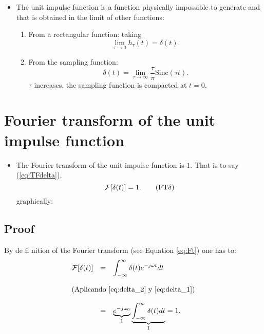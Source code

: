 \begin{itemize}
\item The unit impulse function is a function physically impossible to
  generate and that is obtained in the limit of other functions:
  \begin{enumerate}
  \item From a rectangular function:
    taking
    $$
    \lim_{\tau\rightarrow0}h_\tau(t) = \delta(t).
    $$
  \item From the sampling function:
    \begin{equation}
      \delta(t) =
      \lim_{\tau\rightarrow\infty}\frac{\tau}{\pi}\mathrm{Sinc}(\tau
      t).  \tag{delta\_muestreo}
      \label{eq:delta_muestreo}
    \end{equation}
    $\tau$ increases, the sampling function is compacted at $t=0$.
  \end{enumerate}
\end{itemize}

\section{Fourier transform of the unit impulse function}
\begin{itemize}
\item [] The Fourier transform of the unit impulse function is
  $1$. That is to say (\ref{eq:TFdelta}),
  \begin{equation}
    {\cal{F}}[\delta(t)]=1.
    \tag{FT$\delta$}
    \label{eq:TFdelta}
  \end{equation}
  graphically:
\end{itemize}
\subsection*{Proof}
By de fi nition of the Fourier transform (see Equation \ref{eq:Ft}) one has to:
\begin{equation*}
  \begin{array}{rcl}
    {\cal F}[\delta(t)] & = & \displaystyle\int_{-\infty}^\infty\delta(t)e^{-j\omega t}dt\\\\
    \multicolumn{3}{l}{\text{(Aplicando \ref{eq:delta_2} y \ref{eq:delta_1})}}\\\\
    & = & \underbrace{e^{-j\omega_0}}_{1}\underbrace{\displaystyle\int_{-\infty}^\infty\delta(t)dt}_{1} = 1.
  \end{array}
\end{equation*}

